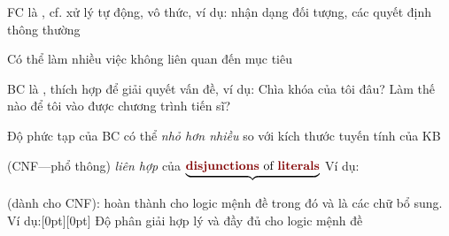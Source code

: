 \documentclass{article}
\begin{document}
\begin{huge}
\maxfigwidth
{}


\maxfigwidth
{}


\maxfigwidth
{}


\maxfigwidth
{}


\maxfigwidth
{}



FC là , cf. xử lý tự động, vô thức,\nl
ví dụ: nhận dạng đối tượng, các quyết định thông thường

Có thể làm nhiều việc không liên quan đến mục tiêu

BC là , thích hợp để giải quyết vấn đề,\nl
ví dụ: Chìa khóa của tôi đâu? Làm thế nào để tôi vào được chương trình tiến sĩ?

Độ phức tạp của BC có thể \emph{nhỏ hơn nhiều} so với kích thước tuyến tính của KB


 (CNF---phổ thông)\nl
    \emph{liên hợp} của $\underbrace{\mbox{\emph{disjunctions} of \emph{literals}}}$\nl
    \nl
    Ví dụ: 

 (dành cho CNF): hoàn thành cho logic mệnh đề
trong đó  và  là các chữ bổ sung. Ví dụ:\hfill\epsfxsize=1.75in\raisebox{-1.5in}[0pt][0pt]{}
Độ phân giải hợp lý và đầy đủ cho logic mệnh đề


\end{huge}
\end{document}
